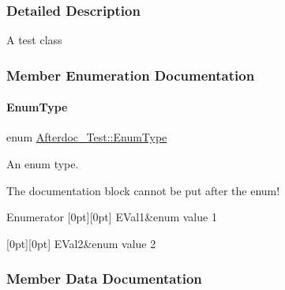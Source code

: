 \subsubsection{Detailed Description}
A test class 

\subsubsection{Member Enumeration Documentation}
\hypertarget{class_afterdoc___test_adab0cd7ad3b4875e245ca8f6238a388a}{}\label{class_afterdoc___test_adab0cd7ad3b4875e245ca8f6238a388a} 
\paragraph{\texorpdfstring{Enum\+Type}{EnumType}}
{\footnotesize\ttfamily enum \hyperlink{class_afterdoc___test_adab0cd7ad3b4875e245ca8f6238a388a}{Afterdoc\+\_\+\+Test\+::\+Enum\+Type}}



An enum type. 

The documentation block cannot be put after the enum! \begin{DoxyEnumFields}{Enumerator}
[0pt][0pt]{}\hypertarget{class_afterdoc___test_adab0cd7ad3b4875e245ca8f6238a388aae054276790e35692ad0abe10c5b75da4}{}\label{class_afterdoc___test_adab0cd7ad3b4875e245ca8f6238a388aae054276790e35692ad0abe10c5b75da4} 
E\+Val1&enum value 1 \\
\hline

[0pt][0pt]{}\hypertarget{class_afterdoc___test_adab0cd7ad3b4875e245ca8f6238a388aac849f37624d8d2d68ca72c4a8df9cf99}{}\label{class_afterdoc___test_adab0cd7ad3b4875e245ca8f6238a388aac849f37624d8d2d68ca72c4a8df9cf99} 
E\+Val2&enum value 2 \\
\hline

\end{DoxyEnumFields}


\subsubsection{Member Data Documentation}
\hypertarget{class_afterdoc___test_a9287a08830e5cdfd9c732bb7932694a0}{}\label{class_afterdoc___test_a9287a08830e5cdfd9c732bb7932694a0} 
